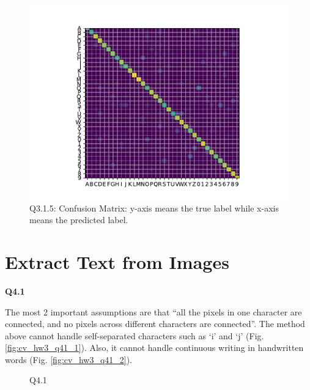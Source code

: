 \documentclass[
  course = {{16-720B Computer Vision}},
  quartile = {{1}},
  assignment = 3-Neural\ Networks\ for\ Recognition,
  name = {{Kangle Deng}},
  email = {{kangled@andrew.cmu.edu}},
  firstexercise = 1
]{aga-homework}
\begin{document}
\begin{figure}
    \centering
    \includegraphics{CV/fig/hw3/q315.pdf}
    \caption{Q3.1.5: Confusion Matrix: y-axis means the true label while x-axis means the predicted label.}
    \label{fig:cv_hw3_q315}
\end{figure}

\section{Extract Text from Images}
\noindent\textbf{Q4.1}

The most 2 important assumptions are that ``all the pixels in one character are connected, and no pixels across different characters are connected''. The method above cannot handle self-separated characters such as `i' and `j' (Fig. \ref{fig:cv_hw3_q41_1}). Also, it cannot handle continuous writing in handwritten words (Fig. \ref{fig:cv_hw3_q41_2}).

\begin{figure}
    \centering
    \caption{Q4.1}
    \label{fig:cv_hw3_q41}
\end{figure}
\end{document}
